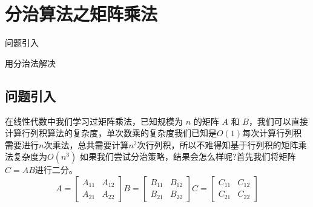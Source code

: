 \chapter{分治算法之矩阵乘法}
\begin{introduction}
	\item 问题引入
	\item 用分治法解决
\end{introduction}
\section{问题引入}
在线性代数中我们学习过矩阵乘法，已知规模为 $n$ 的矩阵 $A$ 和 $B$，我们可以直接计算行列积算法的复杂度，单次数乘的复杂度我们已知是$ O(1)$每次计算行列积需要进行$n$次乘法，总共需要计算$n^2$次行列积，所以不难得知基于行列积的矩阵乘法复杂度为$O(n^3)$
如果我们尝试分治策略，结果会怎么样呢?首先我们将矩阵$C = AB$进行二分。
$$
A=\left[\begin{array}{ll}
A_{11} & A_{12} \\
A_{21} & A_{22}
\end{array}\right] B=\left[\begin{array}{ll}
B_{11} & B_{12} \\
B_{21} & B_{22}
\end{array}\right] C=\left[\begin{array}{ll}
C_{11} & C_{12} \\
C_{21} & C_{22}
\end{array}\right]
$$

